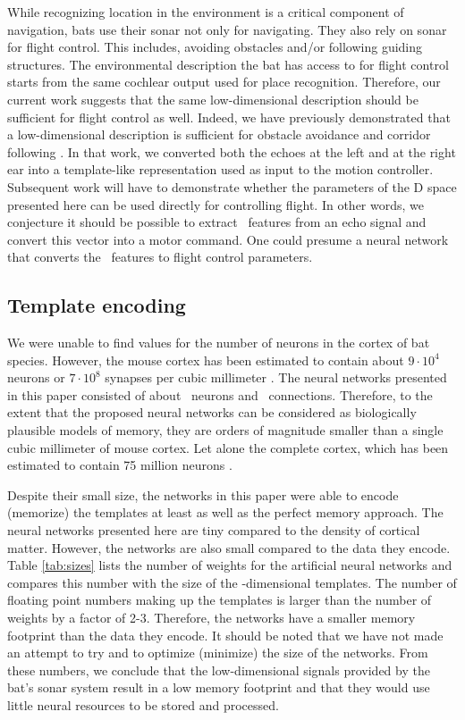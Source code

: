 \documentclass[preprint,5p]{elsarticle}
\begin{document}
While recognizing location in the environment is a critical component of navigation, bats use their sonar not only for navigating. They also rely on sonar for flight control. This includes, avoiding obstacles and/or following guiding structures. The environmental description the bat has access to for flight control starts from the same cochlear output  used for place recognition. Therefore, our current work suggests that the same low-dimensional description should be sufficient for flight control as well. Indeed, we have previously demonstrated that a low-dimensional description is sufficient for obstacle avoidance and corridor following \citep{Vanderelst2015a,Mansour2019}. In that work, we converted both the echoes at the left and at the right ear into a template-like representation used as input to the motion controller. Subsequent work will have to demonstrate whether the parameters of the \pca D space presented here can be used directly for controlling flight. In other words, we conjecture it should be possible to extract \pca\ features from an echo signal and convert this vector into a motor command. One could presume a neural network that converts the \pca\ features to flight control parameters.

\subsection{Template encoding}

We were unable to find values for the number of neurons in the cortex of bat species. However, the mouse cortex has been estimated to contain about $9 \cdot 10^4$ neurons or $7 \cdot 10^8$ synapses per cubic millimeter \citep{Braitenberg2013}. The neural networks presented in this paper consisted of about \nneurons\ neurons and \nweights\ connections. Therefore, to the extent that the proposed neural networks can be considered as biologically plausible models of memory, they are orders of magnitude smaller than a single cubic millimeter of mouse cortex. Let alone the complete cortex, which has been estimated to contain 75 million neurons \citep{Williams2000}. 

Despite their small size, the networks in this paper were able to encode (memorize) the templates at least as well as the perfect memory approach. The neural networks presented here are tiny compared to the density of cortical matter. However, the networks are also small compared to the data they encode. Table \ref{tab:sizes} lists the number of weights for the artificial neural networks and compares this number with the size of the \pca-dimensional templates. The number of floating point numbers making up the templates is larger than the number of weights by a factor of 2-3. Therefore, the networks have a smaller memory footprint than the data they encode. It should be noted that we have not made an attempt to try and to optimize (minimize) the size of the networks. From these numbers, we conclude that the low-dimensional signals provided by the bat's sonar system result in a low memory footprint and that they would use little neural resources to be stored and processed.
\end{document}
